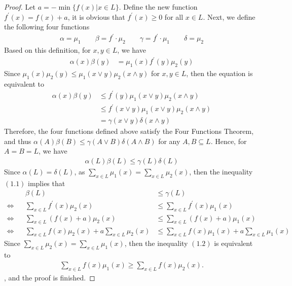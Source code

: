\begin{proof}
  Let $a = -\min \{f(x) | x \in L\}$. Define the new function $f^{'}(x)=f(x)+a$, it is obvious that $f^{'}(x) \geq 0$ for all $x \in L$. Next, we define the following four functions
  \begin{align*}
    \alpha = \mu_{1} \qquad \beta = f^{'} \cdot \mu_{2} \qquad \gamma = f^{'} \cdot \mu_{1} \qquad \delta = \mu_{2}
  \end{align*}
  Based on this definition, for $x,y \in L$, we have
  \begin{align*}
    \alpha(x) \beta(y) &= \mu_{1}(x) f^{'}(y) \mu_{2}(y)
  \end{align*}
  Since $\mu_{1}(x) \mu_{2}(y) \leq \mu_{1}(x \vee y) \mu_{2}(x \wedge y)$ for $x,y \in L$, then the equation is equivalent to
  \begin{align*}
    \alpha(x) \beta(y) &\leq f^{'}(y) \mu_{1}(x \vee y) \mu_{2}(x \wedge y) \\
                       &\leq f^{'}(x \vee y) \mu_{1}(x \vee y) \mu_{2}(x \wedge y) \\
                       &= \gamma(x \vee y) \delta(x \wedge y)
  \end{align*}
  Therefore, the four functions defined above satisfy the Four Functions Theorem, and thus $\alpha(A) \beta(B) \leq \gamma(A \vee B) \delta(A \wedge B)$ for any $A,B \subseteq L$. Hence, for $A = B = L$, we have
  \begin{align*}
    \alpha(L) \beta(L)  \leq \gamma(L) \delta(L) \tag{1.1}
  \end{align*}
  Since $\alpha(L) = \delta(L)$, as $\sum\limits_{x \in L} \mu_{1}(x) = \sum\limits_{x \in L} \mu_{2}(x)$, then the inequality $(1.1)$ implies that 
  \begin{align*}
    && \beta(L) &\leq \gamma(L) \\
    \Leftrightarrow && \sum\limits_{x \in L} f^{'}(x) \mu_{2}(x) &\leq \sum\limits_{x \in L} f^{'}(x) \mu_{1}(x) \\
    \Leftrightarrow && \sum\limits_{x \in L} (f(x)+a) \mu_{2}(x) &\leq \sum\limits_{x \in L} (f(x)+a) \mu_{1}(x) \\
    \Leftrightarrow && \sum\limits_{x \in L} f(x)\mu_{2}(x) + a\sum\limits_{x \in L} \mu_{2}(x) &\leq \sum\limits_{x \in L} f(x)\mu_{1}(x) + a\sum\limits_{x \in L} \mu_{1}(x) \tag{1.2}
  \end{align*}
  Since $\sum\limits_{x \in L} \mu_{2}(x) = \sum\limits_{x \in L} \mu_{1}(x)$, then the inequality $(1.2)$ is equivalent to
  \begin{align*}
    \sum_{x \in L} f(x) \mu_{1}(x) \geq \sum_{x \in L} f(x)  \mu_{2}(x).
  \end{align*}
  , and the proof is finished.
\end{proof}

